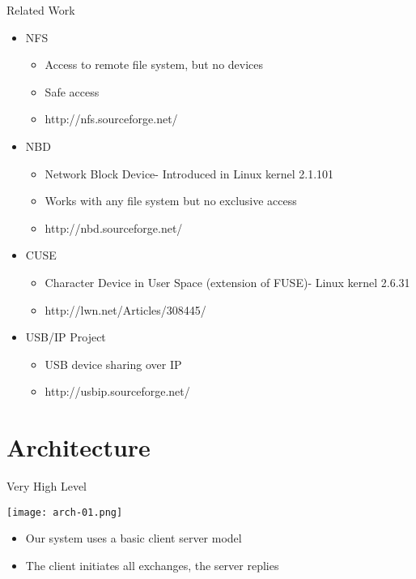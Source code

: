 \documentclass[handout]{beamer}
\begin{document}
\begin{frame}{Related Work}
  \begin{itemize}
    \item NFS
    \begin{itemize}
      \item Access to remote file system, but no devices
      \item Safe access
      \item http://nfs.sourceforge.net/
    \end{itemize}
    \item NBD
    \begin{itemize}
      \item Network Block Device- Introduced in Linux kernel 2.1.101
      \item Works with any file system but no exclusive access 
      \item http://nbd.sourceforge.net/
    \end{itemize}
    \item CUSE
    \begin{itemize}
      \item Character Device in User Space (extension of FUSE)- Linux kernel 2.6.31
      \item http://lwn.net/Articles/308445/
    \end{itemize}
    \item USB/IP Project
    \begin{itemize}
      \item USB device sharing over IP
      \item http://usbip.sourceforge.net/
    \end{itemize}
    
  \end{itemize}
\end{frame}


\section{Architecture}

\begin{frame}[c]{Very High Level}
  \begin{center}
    \texttt{[image: arch-01.png]}
  \end{center}

  \begin{itemize}
    \item<1-> Our system uses a basic client server model
    \item<2-> The client initiates all exchanges, the server replies
  \end{itemize}
\end{frame}
\end{document}

